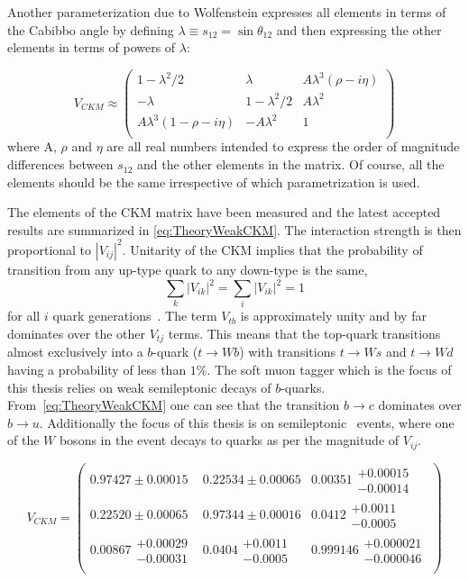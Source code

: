 Another parameterization due to Wolfenstein\cite{Theory:CKMWolfenstein} expresses all elements in terms of the Cabibbo angle by defining $\lambda\equiv s_{12}=\sin \theta_{12}$ and then expressing the other elements in terms of powers of $\lambda$:

\begin{equation}
\label{eq:TheoryWeakCKMWolfenstein}
V_{CKM}
\approx
\begin{pmatrix}
1-\lambda^2/2 & \lambda & A\lambda^3(\rho-i\eta) \\
-\lambda & 1-\lambda^2/2 & A\lambda^2 \\ 
A\lambda^3(1-\rho-i\eta) & -A\lambda^2 & 1\\
\end{pmatrix}
\end{equation}
%
where A, $\rho$ and $\eta$ are all real numbers intended to express the order of magnitude differences between $s_{12}$ and the other elements in the matrix. Of course, all the elements should be the same irrespective of which parametrization is used.

The elements of the CKM matrix have been measured and the latest accepted results are summarized in \ref{eq:TheoryWeakCKM}\cite{Theory:PDGBooklet}. The interaction strength is then proportional to $|V_{ij}|^{2}$. Unitarity of the CKM implies that the probability of transition from any up-type quark to any down-type is the same,
%
\begin{equation} 
  \label{eq:TheoryWeakMixingTotal}
  \sum_{k}|V_{ik}|^{2}=\sum_{i}|V_{ik}|^{2}=1
\end{equation}
%
for all $i$ quark generations~\cite{Theory:WeakUniversaility}.
The term $V_{tb}$ is approximately unity and by far dominates over the other $V_{tj}$ terms. This means that the top-quark transitions almost exclusively into a $b$-quark ($t\rightarrow Wb$) with transitions $t\rightarrow Ws$ and $t\rightarrow Wd$ having a probability of less than $1\%$. The soft muon tagger which is the focus of this thesis relies on weak semileptonic decays of $b$-quarks. From~\ref{eq:TheoryWeakCKM} one can see that the transition $b\rightarrow c$ dominates over $b\rightarrow u$. Additionally the focus of this thesis is on semileptonic \ttbar\ events, where one of the $W$ bosons in the event decays to quarks as per the magnitude of $V_{ij}$.

\begin{equation}
\label{eq:TheoryWeakCKM}
V_{CKM}
=
\begin{pmatrix}
  0.97427\pm0.00015 & 0.22534\pm0.00065 & 0.00351\substack{+0.00015\\-0.00014} \\
  0.22520\pm0.00065 & 0.97344\pm0.00016 & 0.0412\substack{+0.0011\\-0.0005} \\
  0.00867\substack{+0.00029\\-0.00031} & 0.0404\substack{+0.0011\\-0.0005} & 0.999146\substack{+0.000021\\-0.000046} \\
\end{pmatrix}
\end{equation}

